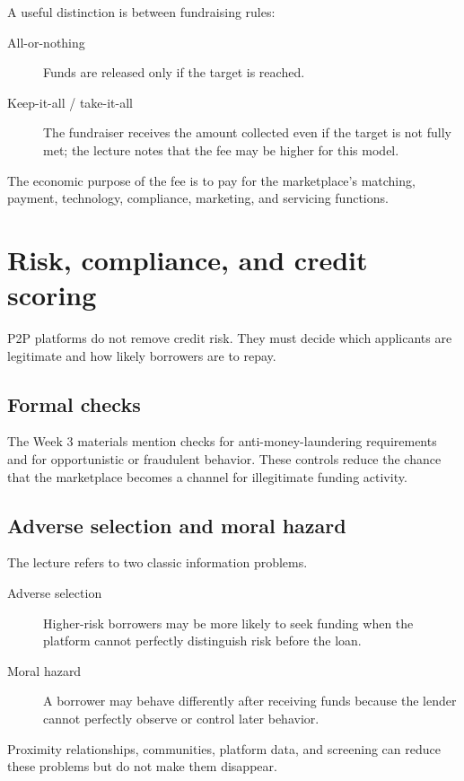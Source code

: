 A useful distinction is between fundraising rules:

\begin{description}
  \item[All-or-nothing] Funds are released only if the target is reached.
  \item[Keep-it-all / take-it-all] The fundraiser receives the amount collected even if the target is not fully met; the lecture notes that the fee may be higher for this model.
\end{description}

The economic purpose of the fee is to pay for the marketplace's matching, payment, technology, compliance, marketing, and servicing functions.

\section{Risk, compliance, and credit scoring}

P2P platforms do not remove credit risk. They must decide which applicants are legitimate and how likely borrowers are to repay.

\subsection{Formal checks}

The Week 3 materials mention checks for anti-money-laundering requirements and for opportunistic or fraudulent behavior. These controls reduce the chance that the marketplace becomes a channel for illegitimate funding activity.

\subsection{Adverse selection and moral hazard}

The lecture refers to two classic information problems.

\begin{description}
  \item[Adverse selection] Higher-risk borrowers may be more likely to seek funding when the platform cannot perfectly distinguish risk before the loan.
  \item[Moral hazard] A borrower may behave differently after receiving funds because the lender cannot perfectly observe or control later behavior.
\end{description}

Proximity relationships, communities, platform data, and screening can reduce these problems but do not make them disappear.

